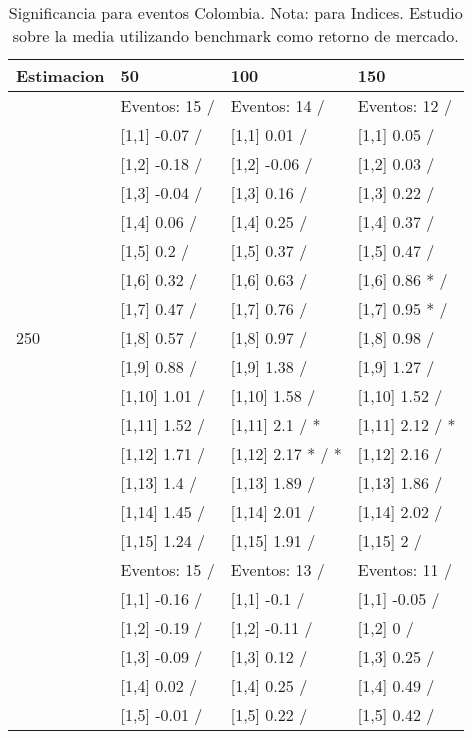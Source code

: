 \begin{table}

\caption{Significancia para eventos Colombia. Nota: para Indices. Estudio sobre la media utilizando benchmark como retorno de mercado.}
\centering
\begin{tabular}[t]{llll}
\toprule
Estimacion & 50 & 100 & 150\\
\midrule
 & Eventos:  15 / & Eventos:  14 / & Eventos:  12 /\\
 & {}[1,1] -0.07  / & {}[1,1] 0.01  / & {}[1,1] 0.05  /\\
 & {}[1,2] -0.18  / & {}[1,2] -0.06  / & {}[1,2] 0.03  /\\
 & {}[1,3] -0.04  / & {}[1,3] 0.16  / & {}[1,3] 0.22  /\\
 & {}[1,4] 0.06  / & {}[1,4] 0.25  / & {}[1,4] 0.37  /\\
\addlinespace
 & {}[1,5] 0.2  / & {}[1,5] 0.37  / & {}[1,5] 0.47  /\\
 & {}[1,6] 0.32  / & {}[1,6] 0.63  / & {}[1,6] 0.86 * /\\
 & {}[1,7] 0.47  / & {}[1,7] 0.76  / & {}[1,7] 0.95 * /\\
250 & {}[1,8] 0.57  / & {}[1,8] 0.97  / & {}[1,8] 0.98  /\\
 & {}[1,9] 0.88  / & {}[1,9] 1.38  / & {}[1,9] 1.27  /\\
\addlinespace
 & {}[1,10] 1.01  / & {}[1,10] 1.58  / & {}[1,10] 1.52  /\\
 & {}[1,11] 1.52  / & {}[1,11] 2.1  / * & {}[1,11] 2.12  / *\\
 & {}[1,12] 1.71  / & {}[1,12] 2.17 * / * & {}[1,12] 2.16  /\\
 & {}[1,13] 1.4  / & {}[1,13] 1.89  / & {}[1,13] 1.86  /\\
 & {}[1,14] 1.45  / & {}[1,14] 2.01  / & {}[1,14] 2.02  /\\
\addlinespace
 & {}[1,15] 1.24  / & {}[1,15] 1.91  / & {}[1,15] 2  /\\
 & Eventos:  15 / & Eventos:  13 / & Eventos:  11 /\\
 & {}[1,1] -0.16  / & {}[1,1] -0.1  / & {}[1,1] -0.05  /\\
 & {}[1,2] -0.19  / & {}[1,2] -0.11  / & {}[1,2] 0  /\\
 & {}[1,3] -0.09  / & {}[1,3] 0.12  / & {}[1,3] 0.25  /\\
\addlinespace
 & {}[1,4] 0.02  / & {}[1,4] 0.25  / & {}[1,4] 0.49  /\\
 & {}[1,5] -0.01  / & {}[1,5] 0.22  / & {}[1,5] 0.42  /\\

\end{tabular}
\end{table}
